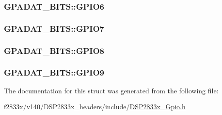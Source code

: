 \subsubsection[{G\+P\+I\+O6}]{ G\+P\+A\+D\+A\+T\+\_\+\+B\+I\+T\+S\+::\+G\+P\+I\+O6}\label{struct_g_p_a_d_a_t___b_i_t_s_a9542378c2ac1c876ef158e2329453dda}
\hypertarget{struct_g_p_a_d_a_t___b_i_t_s_ad466d5fdc128e643c0a3208e7b053c16}{}
\subsubsection[{G\+P\+I\+O7}]{ G\+P\+A\+D\+A\+T\+\_\+\+B\+I\+T\+S\+::\+G\+P\+I\+O7}\label{struct_g_p_a_d_a_t___b_i_t_s_ad466d5fdc128e643c0a3208e7b053c16}
\hypertarget{struct_g_p_a_d_a_t___b_i_t_s_add12038a6e1717beabf8569c959ef374}{}
\subsubsection[{G\+P\+I\+O8}]{ G\+P\+A\+D\+A\+T\+\_\+\+B\+I\+T\+S\+::\+G\+P\+I\+O8}\label{struct_g_p_a_d_a_t___b_i_t_s_add12038a6e1717beabf8569c959ef374}
\hypertarget{struct_g_p_a_d_a_t___b_i_t_s_a26ae2b7aa7309fd84edcecd533082caf}{}
\subsubsection[{G\+P\+I\+O9}]{ G\+P\+A\+D\+A\+T\+\_\+\+B\+I\+T\+S\+::\+G\+P\+I\+O9}\label{struct_g_p_a_d_a_t___b_i_t_s_a26ae2b7aa7309fd84edcecd533082caf}


The documentation for this struct was generated from the following file\+:\begin{DoxyCompactItemize}
\item 
f2833x/v140/\+D\+S\+P2833x\+\_\+headers/include/\hyperlink{_d_s_p2833x___gpio_8h}{D\+S\+P2833x\+\_\+\+Gpio.\+h}\end{DoxyCompactItemize}
